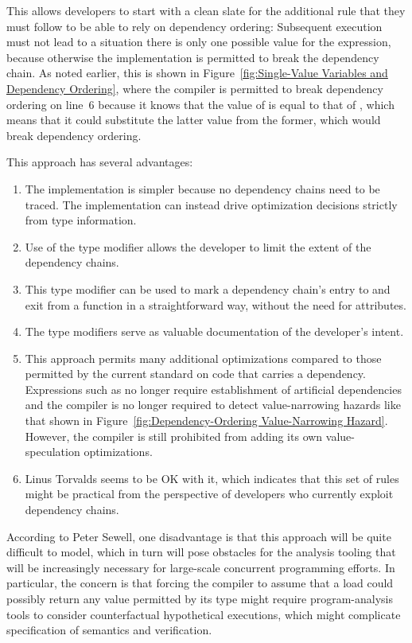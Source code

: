 \documentclass[letterpaper,twocolumn,10pt]{article}
\begin{document}
This allows developers to start with a clean slate for the additional
rule that they must follow to be able to rely on dependency ordering:
Subsequent execution must not lead to a situation there is only
one possible value for the  expression,
because otherwise the implementation is permitted to break
the dependency chain.
As noted earlier, this is shown in
Figure~\ref{fig:Single-Value Variables and Dependency Ordering},
where the compiler is permitted to break dependency ordering on
line~6 because it knows that the value of  is equal to that
of , which means that it could substitute the latter value
from the former, which would break dependency ordering.

This approach has several advantages:

\begin{enumerate}
\item	The implementation is simpler because no dependency chains
	need to be traced.
	The implementation can instead drive optimization decisions
	strictly from type information.
\item	Use of the  type modifier allows
	the developer to limit the extent of the dependency chains.
\item	This type modifier can be used to mark a dependency chain's
	entry to and exit from a function in a straightforward way,
	without the need for attributes.
\item	The  type modifiers serve as
	valuable documentation of the developer's intent.
\item	This approach permits many additional optimizations compared
	to those permitted by the current standard on code that
	carries a dependency.
	Expressions such as  no longer require establishment of
	artificial dependencies and the compiler is no longer required
	to detect value-narrowing hazards like that shown in
	Figure~\ref{fig:Dependency-Ordering Value-Narrowing Hazard}.
	However, the compiler is still prohibited from adding
	its own value-speculation optimizations.
\item	Linus Torvalds seems to be OK with it, which indicates that this
	set of rules might be practical from the perspective of
	developers who currently exploit dependency chains.
\end{enumerate}

According to Peter Sewell, one disadvantage is that this approach
will be quite difficult to model, which in turn will pose obstacles
for the analysis tooling that will be increasingly necessary for
large-scale concurrent programming efforts.
In particular, the concern is that forcing the compiler to assume
that a  load could possibly return any
value permitted by its type might require program-analysis tools to
consider counterfactual hypothetical executions, which might
complicate specification of semantics and verification.
\end{document}
